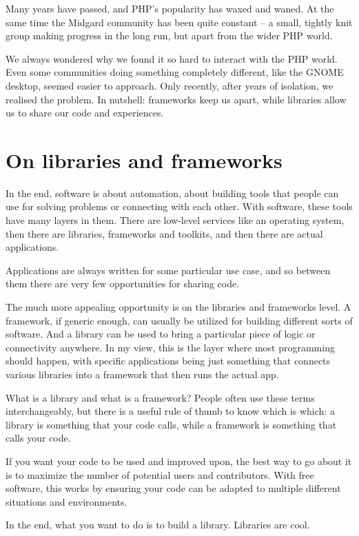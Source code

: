 Many years have passed, and PHP’s popularity has waxed and waned. At the same time the Midgard community has been quite constant -- a small, tightly knit group making progress in the long run, but apart from the wider PHP world.

We always wondered why we found it so hard to interact with the PHP world. Even some communities doing something completely different, like the GNOME desktop, seemed easier to approach. Only recently, after years of isolation, we realised the problem. In nutshell: frameworks keep us apart, while libraries allow us to share our code and experiences.

\section*{On libraries and frameworks}

In the end, software is about automation, about building tools that people can use for solving problems or connecting with each other. With software, these tools have many layers in them. There are low-level services like an operating system, then there are libraries, frameworks and toolkits, and then there are actual applications.

Applications are always written for some particular use case, and so between them there are very few opportunities for sharing code.

The much more appealing opportunity is on the libraries and frameworks level. A framework, if generic enough, can usually be utilized for building different sorts of software. And a library can be used to bring a particular piece of logic or connectivity anywhere. In my view, this is the layer where most programming should happen, with specific applications being just something that connects various libraries into a framework that then runs the actual app.

What is a library and what is a framework? People often use these terms interchangeably, but there is a useful rule of thumb to know which is which: a library is something that your code calls, while a framework is something that calls your code.

If you want your code to be used and improved upon, the best way to go about it is to maximize the number of potential users and contributors. With free software, this works by ensuring your code can be adapted to multiple different situations and environments.

In the end, what you want to do is to build a library. Libraries are cool.

